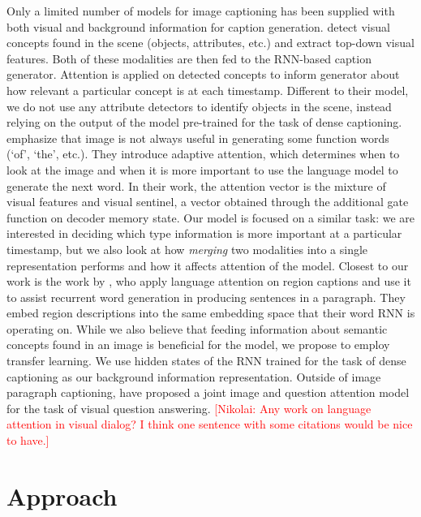 \documentclass[11pt,a4paper]{article}
\newcommand{\kibitz}[2]{\ifnum\Comments=1\textcolor{#1}{#2}\fi}
\newcommand{\nikolai}[1]{\kibitz{red}      {[Nikolai: #1]}}
\begin{document}
Only a limited number of models for image captioning has been supplied with both visual and background information for caption generation.
 detect visual concepts found in the scene (objects, attributes, etc.) and extract top-down visual features.
Both of these modalities are then fed to the RNN-based caption generator.
Attention is applied on detected concepts to inform generator about how relevant a particular concept is at each timestamp. Different to their model, we do not use any attribute detectors to identify objects in the scene, instead relying on the output of the model pre-trained for the task of dense captioning.
 emphasize that image is not always useful in generating some function words (`of', `the', etc.).
They introduce adaptive attention, which determines when to look at the image and when it is more important to use the language model to generate the next word.
In their work, the attention vector is the mixture of visual features and visual sentinel, a vector obtained through the additional gate function on decoder memory state.
Our model is focused on a similar task: we are interested in deciding which type information is more important at a particular timestamp, but we also look at how \textit{merging} two modalities into a single representation performs and how it affects attention of the model.
Closest to our work is the work by \cite{liang2017recurrent}, who apply language attention on region captions and use it to assist recurrent word generation in producing sentences in a paragraph. They embed region descriptions into the same embedding space that their word RNN is operating on. %
While we also believe that feeding information about semantic concepts found in an image is beneficial for the model, we propose to employ transfer learning. We use hidden states of the RNN trained for the task of dense captioning \cite{densecap} as our background information representation.
Outside of image paragraph captioning,  have proposed a joint image and question attention model for the task of visual question answering.
\nikolai{Any work on language attention in visual dialog? I think one sentence with some citations would be nice to have.}

\section{Approach}
\end{document}
